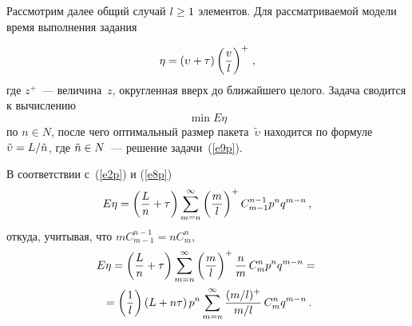 \begin{multicols}{2}
     Рассмотрим далее общий случай $l\hm\geq 1$ элементов.
Для рассматриваемой модели время выполнения задания

\noindent
     \begin{equation}
     \eta=\left(\upsilon+\tau\right) \left(\displaystyle\frac{\displaystyle v\mathstrut}{\displaystyle l\mathstrut}\right)^+\,,
     \label{e8p}
     \end{equation}
где $z^+$~---  величина~$z$, округленная вверх до ближайшего целого. 
Задача сводится к вычислению
\begin{equation}
\min E\eta
\label{e9p}
\end{equation}
по $n\in N$, после чего оптимальный размер пакета~$\tilde{\upsilon}$ находится 
по формуле $\tilde\upsilon\hm=L/\tilde{n}$, где $\tilde{n}\hm\in N$~--- решение 
задачи~(\ref{e9p}). 

\pagebreak
     
     В соответствии с~(\ref{e2p}) и (\ref{e8p})
     $$
     E\eta =\left( \displaystyle\frac{\displaystyle L\mathstrut}{\displaystyle n\mathstrut}+\tau\right) \sum\limits_{m=n}^\infty 
     \left (\displaystyle\frac{\displaystyle m\mathstrut}{\displaystyle l\mathstrut}\right)^+ C_{m-1}^{n-
1} p^n q^{m-n}\,,
     $$
откуда, учитывая, что $m C_{m-1}^{n-1}=nC_m^n$,
\begin{multline}
E\eta = \left( \displaystyle\frac{\displaystyle L\mathstrut}{\displaystyle n\mathstrut}+\tau\right) \sum\limits_{m=n}^\infty 
\left (\displaystyle\frac{\displaystyle m\mathstrut}{\displaystyle l\mathstrut}\right)^+ \displaystyle\frac{\displaystyle n\mathstrut}{\displaystyle m\mathstrut}\,C_m^n 
p^n q^{m-n}={}\\
{}=\left( \displaystyle\frac{\displaystyle 1\mathstrut}{\displaystyle l\mathstrut}\right) \left( L+n\tau\right) p^n \sum\limits_{m=n}^\infty 
\displaystyle\frac{\displaystyle (m/l)^+\mathstrut}{\displaystyle m/l\mathstrut}\,C_m^n q^{m-n}\,.
\label{e10p}
\end{multline}


\end{multicols}
